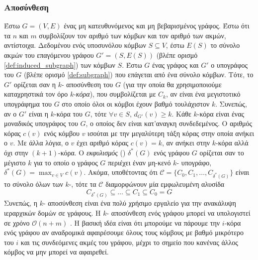 \subsubsection{ Αποσύνθεση}
Έστω $G = (V,E)$ ένας μη κατευθυνόμενος και μη βεβαρισμένος γράφος.
Έστω ότι τα $n$ και $m$ συμβολίζουν τον αριθμό των κόμβων και τον αριθμό των ακμών, αντίστοιχα.
Δεδομένου ενός υποσυνόλου κόμβων $S \subseteq V$, έστω $E(S)$ το σύνολο ακμών του επαγόμενου γράφου $G'=(S,E(S))$  (βλέπε  ορισμό \ref{def:induced_subgraph}) των κόμβων $S$.
Έστω $G$ ένας γράφος και $G'$ ο υπογράφος του $G$ (βλέπε ορισμό \ref{def:subgraph}) που επάγεται από ένα σύνολο κόμβων.
Τότε, το $G'$ ορίζεται σαν η $k$- αποσύνθεση του $G$ (για την οποία θα χρησιμοποιούμε καταχρηστικά τον όρο $k$-\textit{κόρα}), που συμβολίζεται με $C_k$, αν είναι ένα μεγιστοτικό υπογράφημα του $G$ στο οποίο όλοι οι κόμβοι έχουν βαθμό τουλάχιστον $k$.
Συνεπώς, αν ο $G'$ είναι η $k$-κόρα του $G$, τότε $\forall v \in S$, $d_{G'}(v) \geq k$.
Κάθε $k$-κόρα είναι ένας μοναδικός υπογράφος του $G$, ο οποίος δεν είναι κατ'αναγκη συνδεδεμένος.
Ο αριθμός κόρας $c(v)$ ενός κόμβου $v$ ισούται με την μεγαλύτερη τάξη κόρας στην οποία ανήκει ο $v$.
Με άλλα λόγια, ο $v$ έχει αριθμό κόρας $c(v) = k$, αν ανήκει στην $k$-κόρα αλλά όχι στην $(k+1)$-κόρα.
Ο \textit{εκφυλισμός} () $\delta^*(G)$ ενός γράφου $G$ ορίζεται σαν το μέγιστο $k$ για το οποίο ο γράφος $G$ περιέχει έναν μη-κενό $k$- υπογράφο, $\delta^*(G) = \max_{v \in V}c(v)$.
Ακόμα, υποθέτοντας ότι $\mathcal{C} = \{  C_0, C_1, \ldots, C_{\delta^*(G)} \}$ είναι το σύνολο όλων των $k$-, τότε τα $\mathcal{C}$ διαμορφώνουν μία εμφωλευμένη αλυσίδα
\begin{equation}
    C_{\delta^*(G)} \subseteq \ldots \subseteq C_1 \subseteq C_0 = G
\end{equation}
Συνεπώς, η $k$- αποσύνθεση είναι ένα πολύ χρήσιμο εργαλείο για την ανακάλυψη ιεραρχικών δομών σε γράφους.
Η $k$- αποσύνθεση ενός γράφου μπορεί να υπολογιστεί σε χρόνο $\mathcal{O}(n+m)$ \cite{matula1983smallest,batagelj2011fast}.
Η βασική ιδέα είναι ότι μπορούμε να πάρουμε την $i$-κόρα ενός γράφου αν αναδρομικά αφαιρέσουμε όλους τους κόμβους με βαθμό μικρότερο του $i$ και τις συνδεόμενες ακμές του γράφου, μέχρι το σημείο που κανένας άλλος κόμβος να μην μπορεί να αφαιρεθεί.

